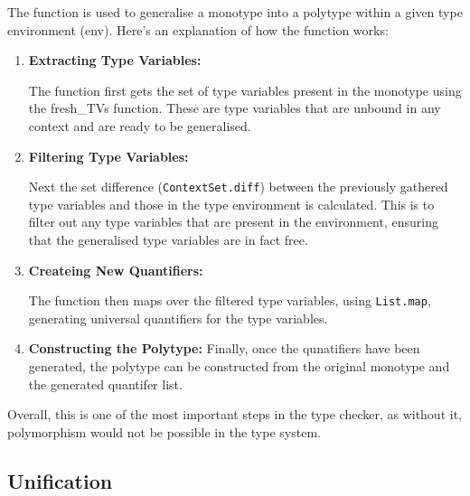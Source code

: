\documentclass{l4proj}
\begin{document}
The function is used to generalise a monotype into a polytype within a given type environment (env). Here's an explanation of how the function works:

\begin{enumerate}
    \item \textbf{Extracting Type Variables:}

    The function first gets the set of type variables present in the monotype using the fresh\_TVs function.
    These are type variables that are unbound in any context and are ready to be generalised.

    \item \textbf{Filtering Type Variables:}

    Next the set difference (\texttt{ContextSet.diff}) between the previously gathered type variables and those in the type environment is calculated.
    This is to filter out any type variables that are present in the environment, ensuring that the generalised type variables are in fact free.

    \item \textbf{Createing New Quantifiers:}
    
    The function then maps over the filtered type variables, using \texttt{List.map}, generating universal quantifiers for the type variables.

    \item \textbf{Constructing the Polytype:}
    Finally, once the qunatifiers have been generated, the polytype can be constructed from the original monotype and the generated quantifer list.
\end{enumerate}

Overall, this is one of the most important steps in the type checker, as without it, polymorphism would not be possible in the type system.

\subsection{Unification}
\end{document}
